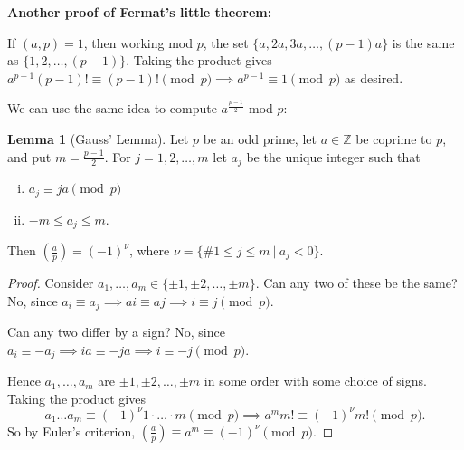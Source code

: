 \documentclass{article}
\theoremstyle{definition}
\newtheorem{lemma}[theorem]{Lemma}
\begin{document}

\textbf{Another proof of Fermat's little theorem:}

If $(a,p)=1$, then working mod $p$, the set $\{a,2a,3a,\ldots,(p-1)a\}$ is the same as $\{1,2,\ldots,(p-1)\}$. Taking the product gives $a^{p-1}(p-1)! \equiv (p-1)! \pmod{p} \implies a^{p-1}\equiv 1\pmod{p}$ as desired.
\vspace{1mm}

We can use the same idea to compute $a^{\frac{p-1}{2}}$ mod $p$:

\begin{lemma}[Gauss' Lemma]
    Let $p$ be an odd prime, let $a \in\mathbb{Z}$ be coprime to $p$, and put $m=\frac{p-1}{2}$. For $j=1,2,\ldots,m$ let $a_j$ be the unique integer such that
    \begin{enumerate}[(i)]
        \item $a_j \equiv ja \pmod{p}$
        \item $-m\le a_j \le m$.
    \end{enumerate}
    Then $\left(\frac{a}{p}\right) = (-1)^\nu$, where $\nu = \{\# 1\le j \le m ~|~ a_j < 0\}$.
\end{lemma}
\begin{proof}
    Consider $a_1,\ldots,a_m \in \{\pm1,\pm2,\ldots,\pm m\}$. Can any two of these be the same? No, since $a_i \equiv a_j \implies ai\equiv aj \implies i \equiv j \pmod{p}$. 

    Can any two differ by a sign? No, since $a_i \equiv -a_j \implies ia \equiv -ja \implies i \equiv -j \pmod{p}$.

    Hence $a_1,\ldots,a_m$ are $\pm1,\pm2, \ldots, \pm m$ in some order with some choice of signs. Taking the product gives $$a_1\ldots a_m \equiv (-1)^\nu 1\cdot \ldots \cdot m \pmod{p} \implies a^m m! \equiv (-1)^\nu m! \pmod{p}.$$
    So by Euler's criterion, $\left(\frac{a}{p}\right) \equiv  a^m \equiv (-1)^\nu \pmod{p}$.
\end{proof}
\end{document}
